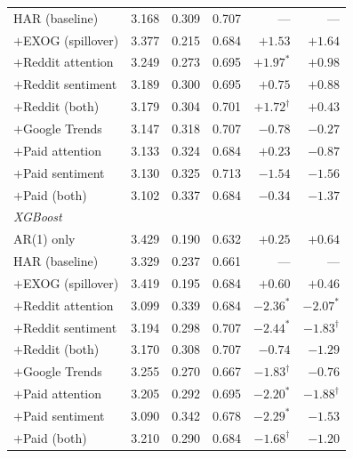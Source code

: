 \documentclass[12pt, a4paper]{article}
\begin{document}
\begin{table}[htbp]
\begin{tabular}{l r r r r r}
        HAR (baseline)         & 3.168 & 0.309 & 0.707 & ---            & ---           \\
        \(+\)EXOG (spillover)  & 3.377 & 0.215 & 0.684 & $+1.53$        & $+1.64$       \\
        \(+\)Reddit attention  & 3.249 & 0.273 & 0.695 & $+1.97^{*}$    & $+0.98$       \\
        \(+\)Reddit sentiment  & 3.189 & 0.300 & 0.695 & $+0.75$        & $+0.88$       \\
        \(+\)Reddit (both)     & 3.179 & 0.304 & 0.701 & $+1.72^{\dagger}$ & $+0.43$    \\
        \(+\)Google Trends     & 3.147 & 0.318 & 0.707 & $-0.78$        & $-0.27$       \\
        \(+\)Paid attention    & 3.133 & 0.324 & 0.684 & $+0.23$        & $-0.87$       \\
        \(+\)Paid sentiment    & 3.130 & 0.325 & 0.713 & $-1.54$        & $-1.56$       \\
        \(+\)Paid (both)       & 3.102 & 0.337 & 0.684 & $-0.34$        & $-1.37$       \\
        \midrule
        \multicolumn{6}{l}{\textit{XGBoost}}\\
        AR(1) only             & 3.429 & 0.190 & 0.632 & $+0.25$        & $+0.64$       \\
        HAR (baseline)         & 3.329 & 0.237 & 0.661 & ---            & ---           \\
        \(+\)EXOG (spillover)  & 3.419 & 0.195 & 0.684 & $+0.60$        & $+0.46$       \\
        \(+\)Reddit attention  & 3.099 & 0.339 & 0.684 & $-2.36^{*}$    & $-2.07^{*}$   \\
        \(+\)Reddit sentiment  & 3.194 & 0.298 & 0.707 & $-2.44^{*}$    & $-1.83^{\dagger}$ \\
        \(+\)Reddit (both)     & 3.170 & 0.308 & 0.707 & $-0.74$        & $-1.29$       \\
        \(+\)Google Trends     & 3.255 & 0.270 & 0.667 & $-1.83^{\dagger}$ & $-0.76$    \\
        \(+\)Paid attention    & 3.205 & 0.292 & 0.695 & $-2.20^{*}$    & $-1.88^{\dagger}$ \\
        \(+\)Paid sentiment    & 3.090 & 0.342 & 0.678 & $-2.29^{*}$    & $-1.53$       \\
        \(+\)Paid (both)       & 3.210 & 0.290 & 0.684 & $-1.68^{\dagger}$ & $-1.20$    \\
        \bottomrule
    \end{tabular}
\end{table}
\end{document}
